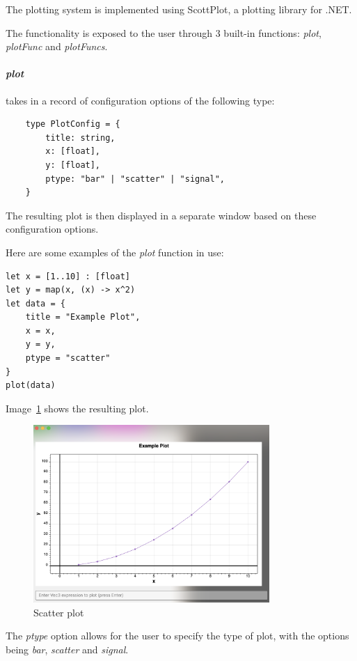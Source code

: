 The plotting system is implemented using ScottPlot\citep{scottPlot}, a plotting library for .NET\@.

The functionality is exposed to the user through 3 built-in functions: \textit{plot}, \textit{plotFunc} and 
\textit{plotFuncs}.

\paragraph{\textit{plot}} takes in a record of configuration options of the following type:

\begin{verbatim}
    type PlotConfig = {
        title: string,
        x: [float],
        y: [float],
        ptype: "bar" | "scatter" | "signal",
    }
\end{verbatim}

The resulting plot is then displayed in a separate window based on these configuration options.

Here are some examples of the \textit{plot} function in use:

\begin{verbatim}
let x = [1..10] : [float]
let y = map(x, (x) -> x^2)
let data = {
    title = "Example Plot",
    x = x,
    y = y,
    ptype = "scatter"
}
plot(data)
\end{verbatim}

Image~\ref{fig:scatter-plot} shows the resulting plot.

\begin{figure}[H]
    \centering
    \includegraphics[width=0.8\textwidth]{assets/scatterPlot}
    \caption{Scatter plot}\label{fig:scatter-plot}
\end{figure}

The \textit{ptype} option allows for the user to specify the type of plot, with the options being \textit{bar},
\textit{scatter} and \textit{signal}.

